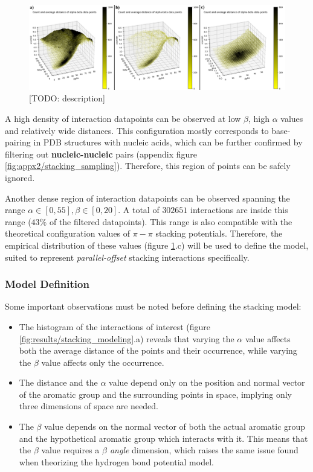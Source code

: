       \begin{figure}[H]
        \centering
        \includegraphics[width=1\textwidth]{figures/results/stacking_sampling.png}
        \caption{\label{fig:results/stacking_sampling} [TODO: description]}
      \end{figure}

      A high density of interaction datapoints can be observed at low $\beta$, high $\alpha$ values and relatively wide distances. This configuration mostly corresponds to base-pairing in PDB structures with nucleic acids, which can be further confirmed by filtering out \textbf{nucleic-nucleic} pairs (appendix figure \ref{fig:appx2/stacking_sampling}). Therefore, this region of points can be safely ignored.

      Another dense region of interaction datapoints can be observed spanning the range $\alpha \in [0,55], \beta \in [0,20]$. A total of $302651$ interactions are inside this range ($43 \%$ of the filtered datapoints). This range is also compatible with the theoretical configuration values of $\pi-\pi$ stacking potentials. Therefore, the empirical distribution of these values (figure \ref{fig:results/stacking_sampling}.c) will be used to define the model, suited to represent \textit{parallel-offset} stacking interactions specifically.

    \subsubsection{Model Definition}
      Some important observations must be noted before defining the stacking model:

      \begin{itemize}
        \item The histogram of the interactions of interest (figure \ref{fig:results/stacking_modeling}.a) reveals that varying the $\alpha$ value affects both the average distance of the points and their occurrence, while varying the $\beta$ value affects only the occurrence.
        \item The distance and the $\alpha$ value depend only on the position and normal vector of the aromatic group and the surrounding points in space, implying only three dimensions of space are needed.
        \item The $\beta$ value depends on the normal vector of both the actual aromatic group and the hypothetical aromatic group which interacts with it. This means that the $\beta$ value requires a \textit{$\beta$ angle} dimension, which raises the same issue found when theorizing the hydrogen bond potential model.
      \end{itemize}

